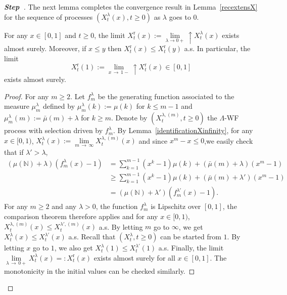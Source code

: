 \documentclass[AHL,Unicode,longabstracts,published]{cedram}
\newcommand{\rmr}{\mathrm{r}}
\newcommand{\bbN}{\mathbb{N}}
\newcounter{stepcount}
\newenvironment{step}{\refstepcounter{stepcount}\begin{proof}[\textbf{Step~\thestepcount}]}{\end{proof}}
\begin{document}
\begin{step}
The next lemma completes the convergence result in Lemma~\ref{recextensX} for the sequence of processes $(X^{\lambda}_t(x),t\geq 0)$ as $\lambda$ goes to $0$.
\begin{lemm}\label{almostsureinx}
For any $x\in [0,1]$ and $t\geq 0$, the limit $X^{\rmr}_t(x):=\underset{\lambda \rightarrow 0+}{\lim}\! \uparrow X_t^{\lambda}(x)$ exists almost surely. Moreover, if $x\leq y$ then $X_t^{\rmr}(x)\leq X_t^{\rmr}(y)$ a.s. In particular, the limit
\[
X_t^{\rmr}(1):=\underset{x\,\rightarrow\,1-}{\lim}\! \uparrow X_t^{\rmr}(x)\in [0,1]
\]
exists almost surely.
\end{lemm}

\begin{proof}
For any $m\geq 2$. Let $f^{\lambda}_m$ be the generating function associated to the measure $\mu^{\lambda}_m$ defined by $\mu^{\lambda}_m(k):=\mu(k)$ for $k\leq m-1$ and $\mu^{\lambda}_m(m):=\bar\mu(m)+\lambda$ for $k\geq m$. Denote by $(X_t^{\lambda,(m)},t\geq 0)$ the $\Lambda$-WF process with selection driven by $f^{\lambda}_m$. By Lemma~\ref{identificationXinfinity}, for any $x\in [0,1)$, $X_t^{\lambda}(x):=\underset{m\,\rightarrow\,\infty}{\lim} X_t^{\lambda,(m)}(x)$ and since $x^{m}-x\leq 0$,\linebreak we easily check that if $\lambda'>\lambda$,
\begin{align*}
(\mu(\bbN)+\lambda)\left(f_{m}^{\lambda}(x)-1\right)&=\sum_{k=1}^{m-1}(x^k-1)\mu(k)+(\bar{\mu}(m)+\lambda)(x^{m}-1)\\
&\geq \sum_{k=1}^{m-1}(x^k-1)\mu(k)+(\bar{\mu}(m)+\lambda')(x^{m}-1)\\
&=(\mu(\bbN)+\lambda')\left(f_{m}^{\lambda'}(x)-1\right).
\end{align*}
For any $m\geq 2$ and any $\lambda>0$, the function $f_{m}^{\lambda}$ is Lipschitz over $[0,1]$, the comparison theorem therefore applies and for any $x\in [0,1)$, $X_t^{\lambda,(m)}(x)\leq X_t^{\lambda',(m)}(x)$ a.s. By letting $m$ go to $\infty$, we get $X_t^{\lambda}(x)\leq X_t^{\lambda'}(x)$ a.s. Recall that $(X^{\lambda}_t,t\geq 0)$ can be started from $1$. By letting $x$ go to $1$, we also get $X_t^{\lambda}(1)\leq X_t^{\lambda'}(1)$ a.s. Finally, the limit $\underset{\lambda\,\rightarrow\,0+}{\lim} X_t^{\lambda}(x)=:X_t^{\rmr}(x)$ exists almost surely for all $x\in [0,1]$. The monotonicity in the initial values can be checked similarly.
\end{proof}\let\qed\relax
\end{step}
\vspace*{4pt}
\end{document}
